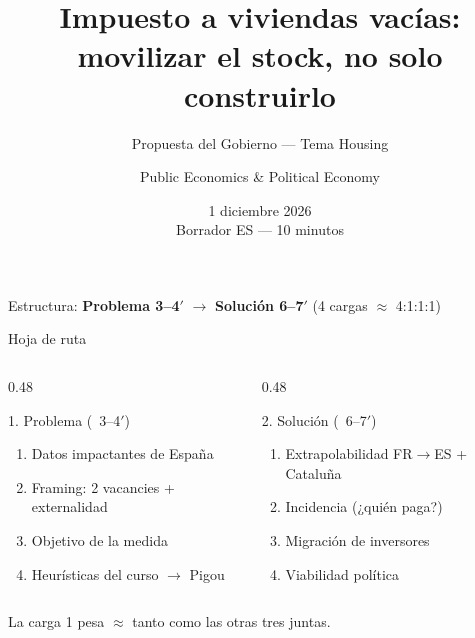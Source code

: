 \documentclass[aspectratio=169,11pt]{beamer}
\title{Impuesto a viviendas vacías:\\movilizar el stock, no solo construirlo}
\subtitle{Propuesta del Gobierno --- Tema Housing}
\author{Public Economics \& Political Economy}
\date{1 diciembre 2026 \\[0.3em] {\small Borrador ES --- 10 minutos}}
\begin{document}
\begin{frame}
  \titlepage
  \vspace{-1em}
  {\footnotesize Estructura: \textbf{Problema 3--4$'$} $\rightarrow$ \textbf{Solución 6--7$'$} (4 cargas $\approx$ 4{:}1{:}1{:}1)}
\end{frame}

\begin{frame}{Hoja de ruta}
  \begin{columns}[T]
    \begin{column}{0.48\textwidth}
      \begin{block}{1. Problema (~3--4$'$)}
        \begin{enumerate}\setlength\itemsep{0.35em}
          \item Datos impactantes de España
          \item Framing: 2 vacancies + externalidad
          \item Objetivo de la medida
          \item Heurísticas del curso $\rightarrow$ Pigou
        \end{enumerate}
      \end{block}
    \end{column}
    \begin{column}{0.48\textwidth}
      \begin{exampleblock}{2. Solución (~6--7$'$)}
        \begin{enumerate}\setlength\itemsep{0.35em}
          \item[\textbf{1.}] Extrapolabilidad FR$\rightarrow$ES + Cataluña
          \item[\textbf{2.}] Incidencia (¿quién paga?)
          \item[\textbf{3.}] Migración de inversores
          \item[\textbf{4.}] Viabilidad política
        \end{enumerate}
      \end{exampleblock}
    \end{column}
  \end{columns}
  \vspace{0.8em}
  \centering
  {\small La carga 1 pesa $\approx$ tanto como las otras tres juntas.}
\end{frame}

\end{document}
